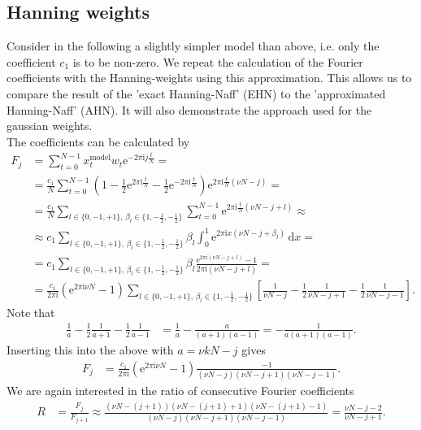 \documentclass[english, parskip=full]{scrartcl}
\newcommand{\intx}{}
\newcommand{\kla}{}
\newcommand{\klam}{}
\newcommand{\tecxt}{}
\newcommand{\I}{\text{i}}
\newcommand{\e}{\text{e}}
\begin{document}
\subsection{Hanning weights}
Consider in the following a slightly simpler model than above, i.e. only the coefficient $c_1$ is to be non-zero.
We repeat the calculation of the Fourier coefficients with the Hanning-weights using this approximation.
This allows us to compare the result of the 'exact Hanning-Naff' (EHN) to the 'approximated Hanning-Naff' (AHN).
It will also demonstrate the approach used for the gaussian weights.
\\
The coefficients can be calculated by
\begin{align}
F_j&=\sum_{t=0}^{N-1}x_t^\tecxt\text{model}w_t\e^{-2\pi\I j\frac{t}{N}}=\\
&=\frac{c_1}{N}\sum_{t=0}^{N-1}\kla\left( {1-\frac{1}{2}\e^{2\pi\I\frac{t}{N}}-\frac{1}{2}\e^{-2\pi\I \frac{t}{N}}} \right)\e^{2\pi\I \frac{t}{N}\kla\left( {\nu N - j} \right)}=\\
&=\frac{c_1}{N}\sum_{l\in\{0,-1,+1\},\,\beta_l\in\{1,-\frac{1}{2},-\frac{1}{2}\}}\sum_{t=0}^{N-1}\e^{2\pi\I \frac{t}{N}\kla\left( {\nu N - j+l} \right)}\approx\\
&\approx c_1\sum_{l\in\{0,-1,+1\},\,\beta_l\in\{1,-\frac{1}{2},-\frac{1}{2}\}}\beta_l\intx\int_{0}^{1}\e^{2\pi\I x (\nu N - j+\beta_l)}\,\mathrm{d}x=\\
&=c_1\sum_{l\in\{0,-1,+1\},\,\beta_l\in\{1,-\frac{1}{2},-\frac{1}{2}\}}\beta_l\frac{\e^{2\pi\I (\nu N-j+l)}-1}{2\pi\I (\nu N-j+l)}=\\
&=\frac{c_1}{2\pi\I}\kla\left( {\e^{2\pi\I \nu N}-1} \right)\sum_{l\in\{0,-1,+1\},\,\beta_l\in\{1,-\frac{1}{2},-\frac{1}{2}\}}\klam\left[ {\frac{1}{\nu N-j}-\frac{1}{2}\frac{1}{\nu N -j+1}-\frac{1}{2}\frac{1}{\nu N-j-1}} \right].
\end{align}
Note that 
\begin{align}
\frac{1}{a}-\frac{1}{2}\frac{1}{a+1}-\frac{1}{2}\frac{1}{a-1}&=\frac{1}{a}-\frac{a}{(a+1)(a-1)}=-\frac{1}{a(a+1)(a-1)}.
\end{align}
Inserting this into the above with $a=\nu kN-j$ gives
\begin{align}
F_j&=\frac{c_1}{2\pi\I}\kla\left( {\e^{2\pi\I \nu N}-1} \right)\frac{-1}{(\nu N-j)(\nu N-j+1)(\nu N-j-1)}.
\end{align}
We are again interested in the ratio of consecutive Fourier coefficients
\begin{align}
R&=\frac{F_j}{F_{j+1}}\approx\frac{(\nu N-(j+1))(\nu N-(j+1)+1)(\nu N-(j+1)-1)}{(\nu N-j)(\nu N-j+1)(\nu N-j-1)}=\frac{\nu N-j-2}{\nu N -j +1}.
\end{align}
\end{document}
